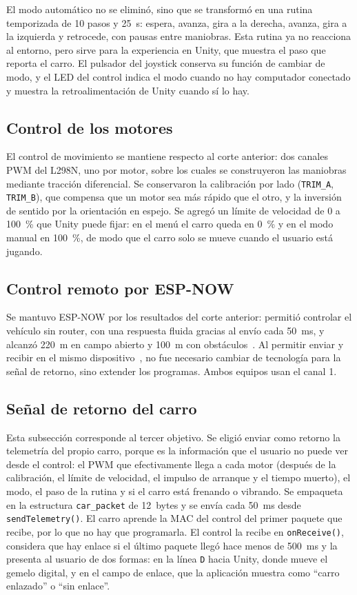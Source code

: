 \documentclass[journal]{IEEEtran}
\begin{document}
El modo automático no se eliminó, sino que se transformó en una rutina temporizada de 10 pasos y 25~s: espera, avanza, gira a la derecha, avanza, gira a la izquierda y retrocede, con pausas entre maniobras. Esta rutina ya no reacciona al entorno, pero sirve para la experiencia en Unity, que muestra el paso que reporta el carro. El pulsador del joystick conserva su función de cambiar de modo, y el LED del control indica el modo cuando no hay computador conectado y muestra la retroalimentación de Unity cuando sí lo hay.

\subsection{Control de los motores}
El control de movimiento se mantiene respecto al corte anterior: dos canales PWM del L298N, uno por motor, sobre los cuales se construyeron las maniobras mediante tracción diferencial. Se conservaron la calibración por lado (\texttt{TRIM\_A}, \texttt{TRIM\_B}), que compensa que un motor sea más rápido que el otro, y la inversión de sentido por la orientación en espejo. Se agregó un límite de velocidad de 0 a 100~\% que Unity puede fijar: en el menú el carro queda en 0~\% y en el modo manual en 100~\%, de modo que el carro solo se mueve cuando el usuario está jugando.

\subsection{Control remoto por ESP-NOW}
Se mantuvo ESP-NOW por los resultados del corte anterior: permitió controlar el vehículo sin router, con una respuesta fluida gracias al envío cada 50~ms, y alcanzó 220~m en campo abierto y 100~m con obstáculos~\cite{corte2}. Al permitir enviar y recibir en el mismo dispositivo~\cite{espnow}, no fue necesario cambiar de tecnología para la señal de retorno, sino extender los programas. Ambos equipos usan el canal 1.

\subsection{Señal de retorno del carro}
Esta subsección corresponde al tercer objetivo. Se eligió enviar como retorno la telemetría del propio carro, porque es la información que el usuario no puede ver desde el control: el PWM que efectivamente llega a cada motor (después de la calibración, el límite de velocidad, el impulso de arranque y el tiempo muerto), el modo, el paso de la rutina y si el carro está frenando o vibrando. Se empaqueta en la estructura \texttt{car\_packet} de 12~bytes y se envía cada 50~ms desde \texttt{sendTelemetry()}. El carro aprende la MAC del control del primer paquete que recibe, por lo que no hay que programarla. El control la recibe en \texttt{onReceive()}, considera que hay enlace si el último paquete llegó hace menos de 500~ms y la presenta al usuario de dos formas: en la línea \texttt{D} hacia Unity, donde mueve el gemelo digital, y en el campo de enlace, que la aplicación muestra como ``carro enlazado'' o ``sin enlace''.
\end{document}
